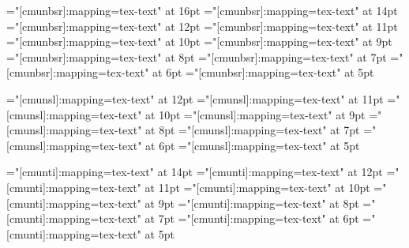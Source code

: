 \font\sixteenssmbf="[cmunbsr]:mapping=tex-text"  at 16pt
\font\fourteenssmbf="[cmunbsr]:mapping=tex-text" at 14pt
\font\twelvessmbf="[cmunbsr]:mapping=tex-text"   at 12pt
\font\elevenssmbf="[cmunbsr]:mapping=tex-text"   at 11pt
\font\tenssmbf="[cmunbsr]:mapping=tex-text"      at 10pt
\font\ninessmbf="[cmunbsr]:mapping=tex-text"     at 9pt
\font\eightssmbf="[cmunbsr]:mapping=tex-text"    at 8pt
\font\sevenssmbf="[cmunbsr]:mapping=tex-text"    at 7pt
\font\sixssmbf="[cmunbsr]:mapping=tex-text"      at 6pt
\font\fivessmbf="[cmunbsr]:mapping=tex-text"     at 5pt

\font\twelvesl="[cmunsl]:mapping=tex-text"      at 12pt
\font\elevensl="[cmunsl]:mapping=tex-text"      at 11pt
\font\tensl="[cmunsl]:mapping=tex-text"         at 10pt
\font\ninesl="[cmunsl]:mapping=tex-text"        at 9pt
\font\eightsl="[cmunsl]:mapping=tex-text"       at 8pt
\font\sevensl="[cmunsl]:mapping=tex-text"       at 7pt
\font\sixsl="[cmunsl]:mapping=tex-text"         at 6pt
\font\fivesl="[cmunsl]:mapping=tex-text"        at 5pt

\font\fourteenit="[cmunti]:mapping=tex-text"    at 14pt
\font\twelveit="[cmunti]:mapping=tex-text"      at 12pt
\font\elevenit="[cmunti]:mapping=tex-text"      at 11pt
\font\tenit="[cmunti]:mapping=tex-text"         at 10pt
\font\nineit="[cmunti]:mapping=tex-text"        at 9pt
\font\eightit="[cmunti]:mapping=tex-text"       at 8pt
\font\sevenit="[cmunti]:mapping=tex-text"       at 7pt
\font\sixit="[cmunti]:mapping=tex-text"         at 6pt
\font\fiveit="[cmunti]:mapping=tex-text"        at 5pt



\def\sizev{%
\def\rm{\fiverm}%
\def\bf{\fivebf}%
\def\it{\fiveit}%
\def\sfdc{\fivessdc}%
\def\sfbf{\fivessbf}%
\def\sfmbf{\fivessmbf}%
\def\sf{\fivess}%
\def\sl{\fivesl}%
\def\tt{\fivett}%
\def\TINY{\sizev}%
\def\Tiny{\sizev}%
\def\tiny{\sizev}%
\def\SMALL{\sizev}%
\def\Small{\sizev}%
\def\small{\sizev}%
\def\large{\sizevi}%
\def\Large{\sizevii}%
\def\LARGE{\sizeviii}%
\def\huge{\sizeix}%
\def\Huge{\sizex}%
\def\HUGE{\sizexi}%
}

\def\sizevi{%
\def\rm{\sixrm}%
\def\bf{\sixbf}%
\def\it{\sixit}%
\def\sfdc{\sixssdc}%
\def\sfbf{\sixssbf}%
\def\sfmbf{\sixssmbf}%
\def\sf{\sixss}%
\def\sl{\sixsl}%
\def\tt{\sixtt}%
\def\TINY{\sizev}%
\def\Tiny{\sizev}%
\def\tiny{\sizev}%
\def\SMALL{\sizev}%
\def\Small{\sizev}%
\def\small{\sizev}%
\def\large{\sizevii}%
\def\Large{\sizeviii}%
\def\LARGE{\sizeix}%
\def\huge{\sizex}%
\def\Huge{\sizexi}%
\def\HUGE{\sizexii}%
}

